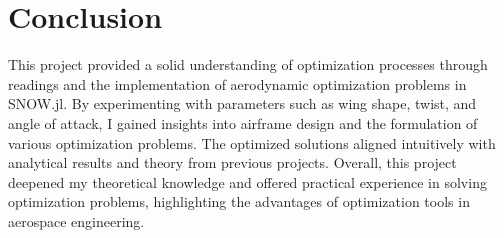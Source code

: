 \documentclass{article}
\begin{document}
\section{Conclusion}
This project provided a solid understanding of optimization processes through readings and the implementation of aerodynamic optimization problems in SNOW.jl. By experimenting with parameters such as wing shape, twist, and angle of attack, I gained insights into airframe design and the formulation of various optimization problems. The optimized solutions aligned intuitively with analytical results and theory from previous projects. Overall, this project deepened my theoretical knowledge and offered practical experience in solving optimization problems, highlighting the advantages of optimization tools in aerospace engineering.


%
%

\end{document}

